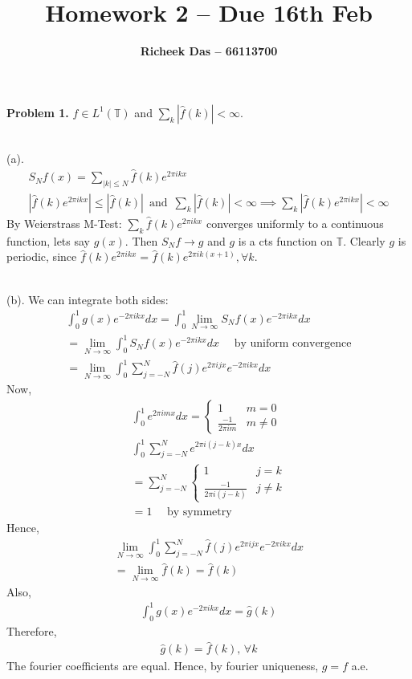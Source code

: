 \documentclass{article}
\title{Homework 2 --  Due 16th Feb}
\author{\textbf{Richeek Das -- 66113700}}
\newcommand{\T}{\mathbb{T}}
\begin{document}
\maketitle

\textbf{Problem 1. } $f \in L^1(\T)$ and $\sum_k |\hat{f}(k)| < \infty$.
\\~

(a). 
\begin{gather*}
    S_N f(x) = \sum_{|k| \leq N} \hat{f}(k) e^{2\pi i kx} \\
    |\hat{f}(k) e^{2\pi i kx}| \leq |\hat{f}(k)| \,\text{ and }\, \sum_{k} |\hat{f}(k)| < \infty \implies \sum_{k} |\hat{f}(k) e^{2\pi i kx}| < \infty
\end{gather*}
By Weierstrass M-Test:
$\sum_{k} \hat{f}(k) e^{2\pi i kx}$ converges uniformly to a continuous function, lets say $g(x)$. Then $S_N f \to g$ and $g$ is a cts function on $\T$. Clearly $g$ is periodic, since $\hat{f}(k) e^{2\pi i kx} = \hat{f}(k) e^{2\pi i k (x+1)}, \forall k$.
\\~

(b). We can integrate both sides:
\begin{gather*}
    \int_{0}^1 g(x) e^{-2\pi ikx} dx = \int_{0}^1 \lim_{N\to \infty}S_Nf(x) e^{-2\pi ikx} dx\\
    = \lim_{N\to \infty} \int_{0}^1 S_Nf(x) e^{-2\pi ikx} dx \quad \text{ by uniform convergence}\\
    = \lim_{N\to \infty} \int_{0}^1 \sum_{j=-N}^N \hat{f}(j) e^{2\pi ijx } e^{-2\pi ikx} dx
\end{gather*}
Now, 
\begin{gather*}
    \int_0^1 e^{2\pi imx}dx = \begin{cases}
        1 & m=0\\
        \frac{-1}{2\pi im} & m\neq 0
    \end{cases}\\
    \int_{0}^1 \sum_{j=-N}^N e^{2\pi i(j-k)x } dx\\
    = \sum_{j=-N}^{N}\begin{cases}
        1 & j=k\\
        \frac{-1}{2\pi i (j-k)} & j\neq k
    \end{cases}\\
    = 1 \quad \text{ by symmetry}
\end{gather*}
Hence,
\begin{gather*}
    \lim_{N\to \infty} \int_{0}^1 \sum_{j=-N}^N \hat{f}(j) e^{2\pi ijx } e^{-2\pi ikx} dx\\
    = \lim_{N\to \infty} \hat{f}(k) = \hat{f}(k)
\end{gather*}
Also,
\begin{gather*}
    \int_{0}^1 g(x) e^{-2\pi ikx} dx = \hat{g}(k)
\end{gather*}
Therefore,
\begin{gather*}
    \hat{g}(k) = \hat{f}(k), \, \forall k
\end{gather*}
The fourier coefficients are equal. Hence, by fourier uniqueness, $g=f$ a.e.
\\~
\end{document}
